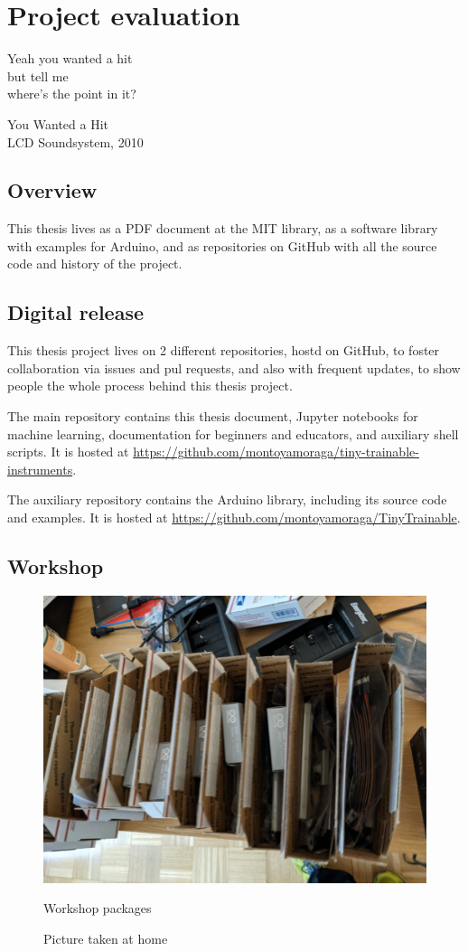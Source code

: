 \chapter{Project evaluation}

\epigraph{Yeah you wanted a hit \\ but tell me \\ where's the point in it?}{You Wanted a Hit \\ LCD Soundsystem, 2010}

\section{Overview}

This thesis lives as a PDF document at the MIT library, as a software library with examples for Arduino, and as repositories on GitHub with all the source code and history of the project.

\section{Digital release}

This thesis project lives on 2 different repositories, hostd on GitHub, to foster collaboration via issues and pul requests, and also with frequent updates, to show people the whole process behind this thesis project.

The main repository contains this thesis document, Jupyter notebooks for machine learning, documentation for beginners and educators, and auxiliary shell scripts. It is hosted at \url{https://github.com/montoyamoraga/tiny-trainable-instruments}.

The auxiliary repository contains the Arduino library, including its source code and examples. It is hosted at \url{https://github.com/montoyamoraga/TinyTrainable}.

\section{Workshop}

\begin{figure}[ht]
  \centering
  \includegraphics[width=0.75\linewidth,height=0.25\textheight,keepaspectratio]{images/workshop-packages.jpg}
  \caption{Workshop packages}
  \caption*{Picture taken at home}
  \label{fig:workshop-packages}
\end{figure}


